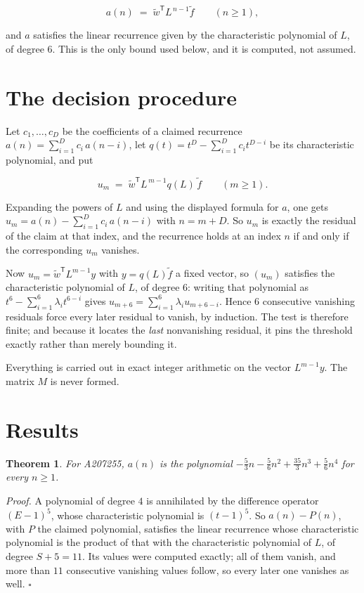 \documentclass[11pt]{article}
\newtheorem{theorem}{Theorem}
\theoremstyle{definition}
\begin{document}
\[a(n) \;=\; \tilde w^{\mathsf T} L^{\,n-1} \tilde f \qquad (n \ge 1),\]

and $a$ satisfies the linear recurrence given by the characteristic polynomial of $L$, of degree $6$. This is the only bound used below, and it is computed, not assumed.

\section{The decision procedure}

Let $c_1,\dots,c_D$ be the coefficients of a claimed recurrence $a(n) = \sum_{i=1}^{D} c_i\,a(n-i)$, let $q(t) = t^{D} - \sum_{i=1}^{D} c_i t^{D-i}$ be its characteristic polynomial, and put

\[u_m \;=\; \tilde w^{\mathsf T} L^{\,m-1} q(L)\,\tilde f \qquad (m \ge 1).\]

Expanding the powers of $L$ and using the displayed formula for $a$, one gets $u_m = a(n) - \sum_{i=1}^{D} c_i\,a(n-i)$ with $n = m + D$. So $u_m$ is exactly the residual of the claim at that index, and the recurrence holds at an index $n$ if and only if the corresponding $u_m$ vanishes.

Now $u_m = \tilde w^{\mathsf T} L^{m-1} y$ with $y = q(L)\tilde f$ a fixed vector, so $(u_m)$ satisfies the characteristic polynomial of $L$, of degree $6$: writing that polynomial as $t^{6} - \sum_{i=1}^{6} \lambda_i t^{6-i}$ gives $u_{m+6} = \sum_{i=1}^{6} \lambda_i u_{m+6-i}$. Hence $6$ consecutive vanishing residuals force every later residual to vanish, by induction. The test is therefore finite; and because it locates the {\itshape last} nonvanishing residual, it pins the threshold exactly rather than merely bounding it.

Everything is carried out in exact integer arithmetic on the vector $L^{m-1}y$. The matrix $M$ is never formed.

\section{Results}

\begin{theorem} For A207255, $a(n)$ is the polynomial $-\frac{5}{3}n - \frac{5}{6}n^{2} + \frac{35}{3}n^{3} + \frac{5}{6}n^{4}$ for every $n \ge 1$.\end{theorem}

{\itshape Proof.} A polynomial of degree $4$ is annihilated by the difference operator $(E-1)^{5}$, whose characteristic polynomial is $(t-1)^{5}$. So $a(n) - P(n)$, with $P$ the claimed polynomial, satisfies the linear recurrence whose characteristic polynomial is the product of that with the characteristic polynomial of $L$, of degree $S + 5 = 11$. Its values were computed exactly; all of them vanish, and more than $11$ consecutive vanishing values follow, so every later one vanishes as well. $\square$
\end{document}
